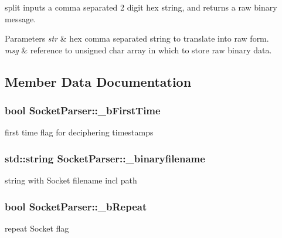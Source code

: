 split inputs a comma separated 2 digit hex string, and returns a raw binary message. 


\begin{DoxyParams}{Parameters}
{\em str} & hex comma separated string to translate into raw form. \\
\hline
{\em msg} & reference to unsigned char array in which to store raw binary data. \\
\hline
\end{DoxyParams}


\subsection{Member Data Documentation}
\hypertarget{class_socket_parser_a8f60d419bee68bb8aa83e27f18ccb5ec}{}
\subsubsection[{\+\_\+b\+First\+Time}]{\setlength{\rightskip}{0pt plus 5cm}bool Socket\+Parser\+::\+\_\+b\+First\+Time\hspace{0.3cm}{\ttfamily [protected]}}\label{class_socket_parser_a8f60d419bee68bb8aa83e27f18ccb5ec}
first time flag for deciphering timestamps \hypertarget{class_socket_parser_ab0ede591a09aea0a188448374b32623a}{}
\subsubsection[{\+\_\+binaryfilename}]{\setlength{\rightskip}{0pt plus 5cm}std\+::string Socket\+Parser\+::\+\_\+binaryfilename\hspace{0.3cm}{\ttfamily [protected]}}\label{class_socket_parser_ab0ede591a09aea0a188448374b32623a}
string with Socket filename incl path \hypertarget{class_socket_parser_a53078737346e16dedb484081796bfc08}{}
\subsubsection[{\+\_\+b\+Repeat}]{\setlength{\rightskip}{0pt plus 5cm}bool Socket\+Parser\+::\+\_\+b\+Repeat\hspace{0.3cm}{\ttfamily [protected]}}\label{class_socket_parser_a53078737346e16dedb484081796bfc08}
repeat Socket flag \hypertarget{class_socket_parser_ac7450e06ee955973ca119c23b4e561c7}{}
